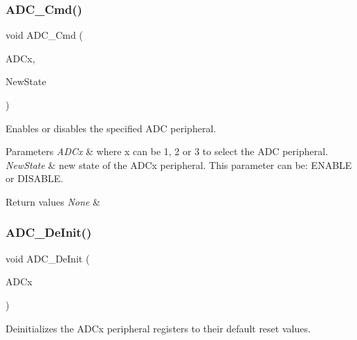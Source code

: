 \subsubsection{\texorpdfstring{ADC\_Cmd()}{ADC\_Cmd()}}
{\footnotesize\ttfamily void A\+D\+C\+\_\+\+Cmd (\begin{DoxyParamCaption}\item[{\mbox{\hyperlink{struct_a_d_c___type_def}{A\+D\+C\+\_\+\+Type\+Def}} $\ast$}]{A\+D\+Cx,  }\item[{\mbox{\hyperlink{group___exported__types_gac9a7e9a35d2513ec15c3b537aaa4fba1}{Functional\+State}}}]{New\+State }\end{DoxyParamCaption})}



Enables or disables the specified A\+DC peripheral. 


\begin{DoxyParams}{Parameters}
{\em A\+D\+Cx} & where x can be 1, 2 or 3 to select the A\+DC peripheral. \\
\hline
{\em New\+State} & new state of the A\+D\+Cx peripheral. This parameter can be\+: E\+N\+A\+B\+LE or D\+I\+S\+A\+B\+LE. \\
\hline
\end{DoxyParams}

\begin{DoxyRetVals}{Return values}
{\em None} & \\
\hline
\end{DoxyRetVals}
\mbox{\label{group___a_d_c___private___functions_ga31fa6bc09de17125e9db2830ce77c09b}} 
\subsubsection{\texorpdfstring{ADC\_DeInit()}{ADC\_DeInit()}}
{\footnotesize\ttfamily void A\+D\+C\+\_\+\+De\+Init (\begin{DoxyParamCaption}\item[{\mbox{\hyperlink{struct_a_d_c___type_def}{A\+D\+C\+\_\+\+Type\+Def}} $\ast$}]{A\+D\+Cx }\end{DoxyParamCaption})}



Deinitializes the A\+D\+Cx peripheral registers to their default reset values. 


